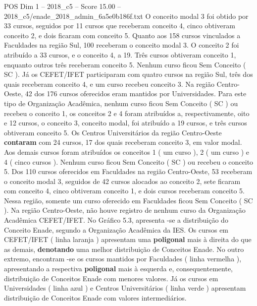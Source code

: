 \begin{textsample}{POS Dim 1 – 2018\_c5 – Score 15.00 – 2018\_c5/enade\_2018\_admin\_6a5e0b186f.txt}
O conceito modal 3 foi obtido por 33 cursos, seguidos por 11 cursos que receberam conceito 4, cinco obtiveram conceito 2, e dois ficaram com conceito 5.
Quanto aos 158 cursos vinculados a Faculdades na região Sul, 100 receberam o conceito modal 3.
O conceito 2 foi atribuído a 33 cursos, e o conceito 4, a 19.
Três cursos obtiveram conceito 1, enquanto outros três receberam conceito 5.
Nenhum curso ficou Sem Conceito ( SC ).
Já os CEFET/IFET participaram com quatro cursos na região Sul, três dos quais receberam conceito 4, e um curso recebeu conceito 3.
Na região Centro-Oeste, 42 dos 176 cursos oferecidos eram mantidos por Universidades.
Para este tipo de Organização Acadêmica, nenhum curso ficou Sem Conceito ( SC ) ou recebeu o conceito 1, os conceitos 2 e 4 foram atribuídos a, respectivamente, oito e 12 cursos, o conceito 3, conceito modal, foi atribuído a 19 cursos, e três cursos obtiveram conceito 5.
Os Centros Universitários da região Centro-Oeste \textbf{contaram} com 24 cursos, 17 dos quais receberam conceito 3, em valor modal.
Aos demais cursos foram atribuídos os conceitos 1 ( um curso ), 2 ( um curso ) e 4 ( cinco cursos ).
Nenhum curso ficou Sem Conceito ( SC ) ou recebeu o conceito 5.
Dos 110 cursos oferecidos em Faculdades na região Centro-Oeste, 53 receberam o conceito modal 3, seguidos de 42 cursos alocados ao conceito 2, sete ficaram com conceito 4, cinco obtiveram conceito 1, e dois cursos receberam conceito 5.
Nessa região, somente um curso oferecido em Faculdades ficou Sem Conceito ( SC ).
Na região Centro-Oeste, não houve registro de nenhum curso da Organização Acadêmica CEFET/IFET.
No Gráfico 5.3, apresenta -se a distribuição do Conceito Enade, segundo a Organização Acadêmica da IES.
Os cursos em CEFET/IFET ( linha laranja ) apresentam uma \textbf{poligonal} mais à direita do que as demais, \textbf{denotando} uma melhor distribuição de Conceitos Enade.
No outro extremo, encontram -se os cursos mantidos por Faculdades ( linha vermelha ), apresentando a respectiva \textbf{poligonal} mais à esquerda e, consequentemente, distribuição de Conceitos Enade com menores valores.
Já os cursos em Universidades ( linha azul ) e Centros Universitários ( linha verde ) apresentam distribuição de Conceitos Enade com valores intermediários.

\end{textsample}
